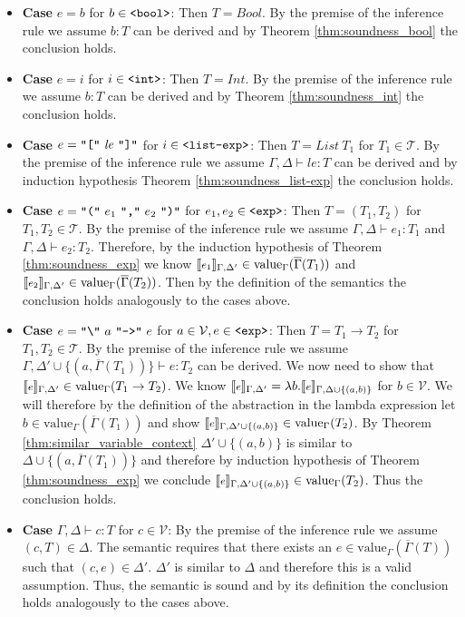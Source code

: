 \documentclass[]{scrbook}
\newcommand{\mf}[1]{\text{\texttt{#1}}}
\newcommand{\semantic}[1]{\llbracket \text{\footnotesize\texttt{#1}} \rrbracket}
\theoremstyle{definition}
\theoremstyle{definition}
\theoremstyle{definition}
\theoremstyle{remark}
\begin{document}
\begin{itemize}
\item\textbf{Case} $e=b$ for $b\in\mf{<bool>}$: Then $T=\mathit{Bool}$. By the premise of the inference rule we assume $b:T$ can be derived and by Theorem \ref{thm:soundness_bool} the conclusion holds.
\item\textbf{Case} $e=i$ for $i\in\mf{<int>}$: Then $T=\mathit{Int}$. By the premise of the inference rule we assume $b:T$ can be derived and by Theorem \ref{thm:soundness_int} the conclusion holds.
\item\textbf{Case} $e=\mf{"["} \ \mathit{le} \ \mf{"]"}$ for $i\in\mf{<list-exp>}$: Then $T = \mathit{List} \ T_1$ for $T_1\in\mathcal{T}$. By the premise of the inference rule we assume  $\Gamma,\Delta\vdash \mathit{le}:T$ can be derived and by induction hypothesis Theorem \ref{thm:soundness_list-exp} the conclusion holds.
\item\textbf{Case} $e=\mf{"("} \ e_1 \ \mf{","} \ e_2 \ \mf{")"}$ for $e_1,e_2\in\mf{<exp>}$: Then $T = (T_1,T_2)$ for $T_1,T_2\in\mathcal{T}$. By the premise of the inference rule we assume $\Gamma,\Delta\vdash e_1:T_1$ and $\Gamma,\Delta\vdash e_2:T_2$. Therefore, by the induction hypothesis of Theorem \ref{thm:soundness_exp} we know \(\semantic{$e_1$}_{\Gamma,\Delta'}\in\text{value}_\Gamma(\overline{\Gamma}(T_1))\) and \(\semantic{$e_2$}_{\Gamma,\Delta'}\in\text{value}_\Gamma(\overline{\Gamma}(T_2))\). Then by the definition of the semantics the conclusion holds analogously to the cases above.
\item\textbf{Case} $e=\mf{"\textbackslash"} \ a \ \mf{"->"} \ e$ for $a\in\mathcal{V},e\in\mf{<exp>}$: Then $T = T_1 \to T_2$ for $T_1,T_2\in\mathcal{T}$. By the premise of the inference rule we assume  $\Gamma,\Delta'\cup\{(a,\overline{\Gamma}(T_1))\}\vdash e: T_2$ can be derived. We now need to show that \(\semantic{$e$}_{\Gamma,\Delta'}\in\text{value}_\Gamma(T_1\to T_2)\). We know \(\semantic{$e$}_{\Gamma,\Delta'}=\lambda b. \semantic{$e$}_{\Gamma,\Delta\cup\{(a,b)\}}\) for $b\in\mathcal{V}$. We will therefore by the definition of the abstraction in the lambda expression let $b\in\text{value}_\Gamma(\overline{\Gamma}(T_1))$ and show \(\semantic{$e$}_{\Gamma,\Delta'\cup\{(a,b)\}}\in\text{value}_\Gamma(T_2)\). By Theorem \ref{thm:similar_variable_context} $\Delta'\cup\{(a,b)\}$ is similar to $\Delta\cup\{(a,\overline{\Gamma}(T_1))\}$ and therefore by induction hypothesis of Theorem \ref{thm:soundness_exp} we conclude \(\semantic{$e$}_{\Gamma,\Delta'\cup\{(a,b)\}}\in\text{value}_\Gamma(T_2)\). Thus the conclusion holds.
\item\textbf{Case} $\Gamma,\Delta\vdash c:T$ for $c\in\mathcal{V}$: By the premise of the inference rule we assume $(c,T)\in\Delta$. The semantic requires that there exists an $e\in\text{value}_\Gamma(\overline{\Gamma}(T))$ such that $(c,e)\in\Delta'$.
$\Delta'$ is similar to $\Delta$ and therefore this is a valid assumption. Thus, the semantic is sound and by its definition the conclusion holds analogously to the cases above.
\end{itemize}
\end{document}
